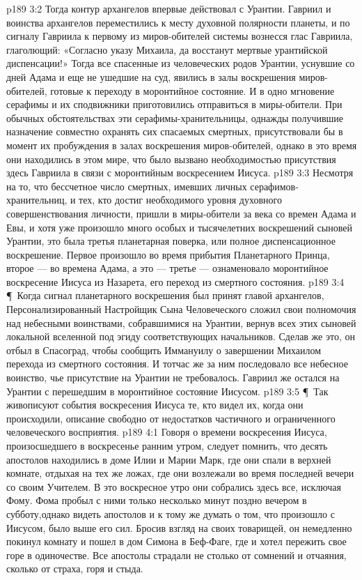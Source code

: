 \vs p189 3:2 Тогда контур архангелов впервые действовал с Урантии. Гавриил и воинства архангелов переместились к месту духовной полярности планеты, и по сигналу Гавриила к первому из миров\hyp{}обителей системы вознесся глас Гавриила, глаголющий: «Согласно указу Михаила, да восстанут мертвые урантийской диспенсации!» Тогда все спасенные из человеческих родов Урантии, уснувшие со дней Адама и еще не ушедшие на суд, явились в залы воскрешения миров\hyp{}обителей, готовые к переходу в моронтийное состояние. И в одно мгновение серафимы и их сподвижники приготовились отправиться в миры\hyp{}обители. При обычных обстоятельствах эти серафимы\hyp{}хранительницы, однажды получившие назначение совместно охранять сих спасаемых смертных, присутствовали бы в момент их пробуждения в залах воскрешения миров\hyp{}обителей, однако в это время они находились в этом мире, что было вызвано необходимостью присутствия здесь Гавриила в связи с моронтийным воскресением Иисуса.
\vs p189 3:3 Несмотря на то, что бессчетное число смертных, имевших личных серафимов\hyp{}хранительниц, и тех, кто достиг необходимого уровня духовного совершенствования личности, пришли в миры\hyp{}обители за века со времен Адама и Евы, и хотя уже произошло много особых и тысячелетних воскрешений сыновей Урантии, это была третья планетарная поверка, или полное диспенсационное воскрешение. Первое произошло во время прибытия Планетарного Принца, второе --- во времена Адама, а это --- третье --- ознаменовало моронтийное воскресение Иисуса из Назарета, его переход из смертного состояния.
\vs p189 3:4 \P\ Когда сигнал планетарного воскрешения был принят главой архангелов, Персонализированный Настройщик Сына Человеческого сложил свои полномочия над небесными воинствами, собравшимися на Урантии, вернув всех этих сыновей локальной вселенной под эгиду соответствующих начальников. Сделав же это, он отбыл в Спасоград, чтобы сообщить Иммануилу о завершении Михаилом перехода из смертного состояния. И тотчас же за ним последовало все небесное воинство, чье присутствие на Урантии не требовалось. Гавриил же остался на Урантии с перешедшим в моронтийное состояние Иисусом.
\vs p189 3:5 \P\ Так живописуют события воскресения Иисуса те, кто видел их, когда они происходили, описание свободно от недостатков частичного и ограниченного человеческого восприятия.
\vs p189 4:1 Говоря о времени воскресения Иисуса, произосшедшего в воскресенье ранним утром, следует помнить, что десять апостолов находились в доме Илии и Марии Марк, где они спали в верхней комнате, отдыхая на тех же ложах, где они возлежали во время последней вечери со своим Учителем. В это воскресное утро они собрались здесь все, исключая Фому. Фома пробыл с ними только несколько минут поздно вечером в субботу,однако видеть апостолов и к тому же думать о том, что произошло с Иисусом, было выше его сил. Бросив взгляд на своих товарищей, он немедленно покинул комнату и пошел в дом Симона в Беф\hyp{}Фаге, где и хотел пережить свое горе в одиночестве. Все апостолы страдали не столько от сомнений и отчаяния, сколько от страха, горя и стыда.
